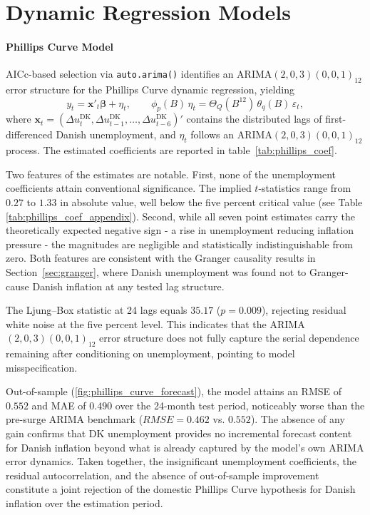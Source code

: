 \section{Dynamic Regression Models}
\paragraph{Phillips Curve Model}

AICc-based selection via \texttt{auto.arima()} identifies an ARIMA$(2,0,3)(0,0,1)_{12}$ error structure for the Phillips Curve dynamic regression, yielding
\begin{equation}
y_t = \mathbf{x}'_t\boldsymbol{\beta} + \eta_t, \qquad
\phi_p(B)\,\eta_t = \Theta_Q(B^{12})\,\theta_q(B)\,\varepsilon_t,
\end{equation}
where $\mathbf{x}_t = (\Delta u^{\text{DK}}_t, \Delta u^{\text{DK}}_{t-1}, \ldots, \Delta u^{\text{DK}}_{t-6})'$ contains the distributed lags of first-differenced Danish unemployment, and $\eta_t$ follows an ARIMA$(2,0,3)(0,0,1)_{12}$ process. The estimated coefficients are reported in table~\ref{tab:phillips_coef}.

Two features of the estimates are notable. First, none of the unemployment coefficients attain conventional significance. The implied $t$-statistics range from $0.27$ to $1.33$ in absolute value, well below the five percent critical value (see Table \ref{tab:phillips_coef_appendix}). Second, while all seven point estimates carry the theoretically expected negative sign - a rise in unemployment reducing inflation pressure - the magnitudes are negligible and statistically indistinguishable from zero. Both features are consistent with the Granger causality results in Section~\ref{sec:granger}, where Danish unemployment was found not to Granger-cause Danish inflation at any tested lag structure.

The Ljung--Box statistic at 24 lags equals $35.17$ ($p = 0.009$), rejecting residual white noise at the five percent level. This indicates that the ARIMA$(2,0,3)(0,0,1)_{12}$ error structure does not fully capture the serial dependence remaining after conditioning on unemployment, pointing to model misspecification. 

Out-of-sample (\ref{fig:phillips_curve_forecast}), the model attains an RMSE of $0.552$ and MAE of $0.490$ over the 24-month test period, noticeably worse than the pre-surge ARIMA benchmark ($RMSE = 0.462$ vs. $0.552$). The absence of any gain confirms that DK unemployment provides no incremental forecast content for Danish inflation beyond what is already captured by the model's own ARIMA error dynamics. Taken together, the insignificant unemployment coefficients, the residual autocorrelation, and the absence of out-of-sample improvement constitute a joint rejection of the domestic Phillips Curve hypothesis for Danish inflation over the estimation period.


